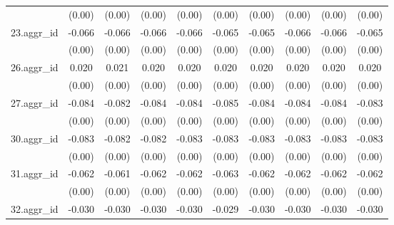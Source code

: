 {\begin{tabular}{l*{9}{c}}
          &   (0.00)         &   (0.00)         &   (0.00)         &   (0.00)         &   (0.00)         &   (0.00)         &   (0.00)         &   (0.00)         &   (0.00)         \\
[1em]
23.aggr\_id&   -0.066\sym{***}&   -0.066\sym{***}&   -0.066\sym{***}&   -0.066\sym{***}&   -0.065\sym{***}&   -0.065\sym{***}&   -0.066\sym{***}&   -0.066\sym{***}&   -0.065\sym{***}\\
          &   (0.00)         &   (0.00)         &   (0.00)         &   (0.00)         &   (0.00)         &   (0.00)         &   (0.00)         &   (0.00)         &   (0.00)         \\
[1em]
26.aggr\_id&    0.020\sym{***}&    0.021\sym{***}&    0.020\sym{***}&    0.020\sym{***}&    0.020\sym{***}&    0.020\sym{***}&    0.020\sym{***}&    0.020\sym{***}&    0.020\sym{***}\\
          &   (0.00)         &   (0.00)         &   (0.00)         &   (0.00)         &   (0.00)         &   (0.00)         &   (0.00)         &   (0.00)         &   (0.00)         \\
[1em]
27.aggr\_id&   -0.084\sym{***}&   -0.082\sym{***}&   -0.084\sym{***}&   -0.084\sym{***}&   -0.085\sym{***}&   -0.084\sym{***}&   -0.084\sym{***}&   -0.084\sym{***}&   -0.083\sym{***}\\
          &   (0.00)         &   (0.00)         &   (0.00)         &   (0.00)         &   (0.00)         &   (0.00)         &   (0.00)         &   (0.00)         &   (0.00)         \\
[1em]
30.aggr\_id&   -0.083\sym{***}&   -0.082\sym{***}&   -0.082\sym{***}&   -0.083\sym{***}&   -0.083\sym{***}&   -0.083\sym{***}&   -0.083\sym{***}&   -0.083\sym{***}&   -0.083\sym{***}\\
          &   (0.00)         &   (0.00)         &   (0.00)         &   (0.00)         &   (0.00)         &   (0.00)         &   (0.00)         &   (0.00)         &   (0.00)         \\
[1em]
31.aggr\_id&   -0.062\sym{***}&   -0.061\sym{***}&   -0.062\sym{***}&   -0.062\sym{***}&   -0.063\sym{***}&   -0.062\sym{***}&   -0.062\sym{***}&   -0.062\sym{***}&   -0.062\sym{***}\\
          &   (0.00)         &   (0.00)         &   (0.00)         &   (0.00)         &   (0.00)         &   (0.00)         &   (0.00)         &   (0.00)         &   (0.00)         \\
[1em]
32.aggr\_id&   -0.030\sym{***}&   -0.030\sym{***}&   -0.030\sym{***}&   -0.030\sym{***}&   -0.029\sym{***}&   -0.030\sym{***}&   -0.030\sym{***}&   -0.030\sym{***}&   -0.030\sym{***}\\

\end{tabular}}
